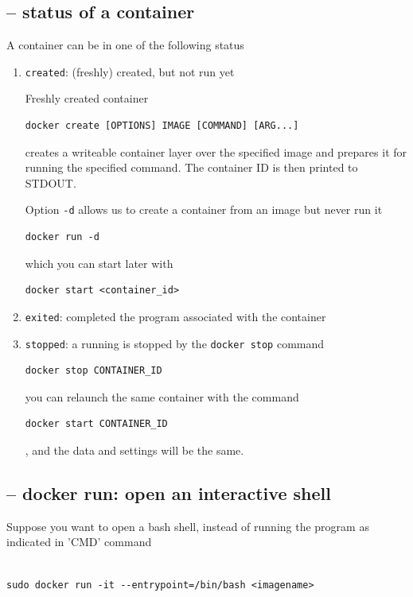 \subsection{-- status of a container}

A container can be in one of the following status
\begin{enumerate}
  \item \verb!created!: (freshly) created, but not run yet

Freshly created container
\begin{verbatim}
docker create [OPTIONS] IMAGE [COMMAND] [ARG...]
\end{verbatim}
creates a writeable container layer over the specified image and prepares it for
running the specified command. The container ID is then printed to STDOUT.

Option \verb!-d! allows us to create a container from an image but never run it
\begin{verbatim}
docker run -d 
\end{verbatim}
which you can start later with
\begin{verbatim}
docker start <container_id> 
\end{verbatim}

  \item \verb!exited!: completed the program associated with the container
  
  \item \verb!stopped!: a running is stopped by the \verb!docker stop! command

\begin{verbatim}
docker stop CONTAINER_ID
\end{verbatim}
you can relaunch the same container with the command 
\begin{verbatim}
docker start CONTAINER_ID
\end{verbatim}, and the data and settings will be the same.

\end{enumerate}

\subsection{-- docker run: open an interactive shell}



Suppose you want to open a bash shell, instead of running the program as indicated in 'CMD'
command
 
\begin{verbatim}

sudo docker run -it --entrypoint=/bin/bash <imagename>
\end{verbatim}

